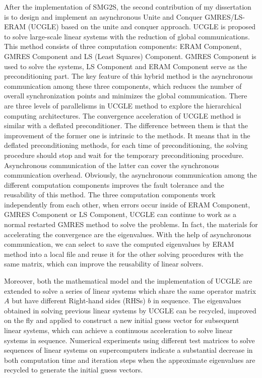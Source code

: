 After the implementation of SMG2S, the second contribution of my dissertation is to design and implement an asynchronous Unite and Conquer GMRES/LS-ERAM (UCGLE) based on the unite and conquer approach. UCGLE is proposed to solve large-scale linear systems with the reduction of global communications. This method consists of three computation components: ERAM Component, GMRES Component and LS (Least Squares) Component. GMRES Component is used to solve the systems, LS Component and ERAM Component serve as the preconditioning part. The key feature of this hybrid method is the asynchronous communication among these three components, which reduces the number of overall synchronization points and minimizes the global communication. There are three levels of parallelisms in UCGLE method to explore the hierarchical computing architectures. The convergence acceleration of UCGLE method is similar with a deflated preconditioner. The difference between them is that the improvement of the former one is intrinsic to the methods. It means that in the deflated preconditioning methods, for each time of preconditioning, the solving procedure should stop and wait for the temporary preconditioning procedure. Asynchronous communication of the latter can cover the synchronous communication overhead. Obviously, the asynchronous communication among the different computation components improves the fault tolerance and the reusability of this method. The three computation components work independently from each other, when errors occur inside of ERAM Component, GMRES Component or LS Component, UCGLE can continue to work as a normal restarted GMRES method to solve the problems. In fact, the materials for accelerating the convergence are the eigenvalues. With the help of asynchronous communication, we can select to save the computed eigenvalues by ERAM method into a local file and reuse it for the other solving procedures with the same matrix, which can improve the reusability of linear solvers.

Moreover, both the mathematical model and the implementation of UCGLE are extended to solve a series of linear systems which share the same operator matrix $A$ but have different Right-hand sides (RHSs) $b$ in sequence. The eigenvalues obtained in solving previous linear systems by UCGLE can be recycled, improved on the fly and applied to construct a new initial guess vector for subsequent linear systems, which can achieve a continuous acceleration to solve linear systems in sequence. Numerical experiments using different test matrices to solve sequences of linear systems on supercomputers indicate a substantial decrease in both computation time and iteration steps when the approximate eigenvalues are recycled to generate the initial guess vectors.

